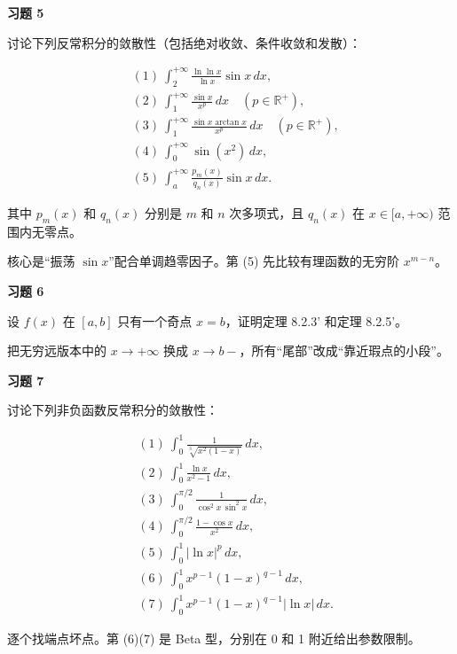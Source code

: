 \begin{exercisebox}
\textbf{习题 5 }

讨论下列反常积分的敛散性（包括绝对收敛、条件收敛和发散）：

\[
      \begin{aligned}
      &(1)\ \int_2^{+\infty}\frac{\ln\ln x}{\ln x}\sin x\,dx,\\
      &(2)\ \int_1^{+\infty}\frac{\sin x}{x^p}\,dx\quad(p\in\mathbb R^+),\\
      &(3)\ \int_1^{+\infty}\frac{\sin x\arctan x}{x^p}\,dx\quad(p\in\mathbb R^+),\\
      &(4)\ \int_0^{+\infty}\sin(x^2)\,dx,\\
      &(5)\ \int_a^{+\infty}\frac{p_m(x)}{q_n(x)}\sin x\,dx.
      \end{aligned}
      \]

其中 \(p_m(x)\) 和 \(q_n(x)\) 分别是 \(m\) 和 \(n\) 次多项式，且 \(q_n(x)\) 在 \(x\in[a,+\infty)\) 范围内无零点。

\begin{hintbox}
核心是“振荡 \(\sin x\)”配合单调趋零因子。第 (5) 先比较有理函数的无穷阶 \(x^{m-n}\)。
\end{hintbox}
\end{exercisebox}

\begin{exercisebox}
\textbf{习题 6 }

设 \(f(x)\) 在 \([a,b]\) 只有一个奇点 \(x=b\)，证明定理 8.2.3' 和定理 8.2.5'。

\begin{hintbox}
把无穷远版本中的 \(x\to+\infty\) 换成 \(x\to b-\)，所有“尾部”改成“靠近瑕点的小段”。
\end{hintbox}
\end{exercisebox}

\begin{exercisebox}
\textbf{习题 7 }

讨论下列非负函数反常积分的敛散性：

\[
      \begin{aligned}
      &(1)\ \int_0^1\frac{1}{\sqrt[3]{x^2(1-x)}}\,dx,\\
      &(2)\ \int_0^1\frac{\ln x}{x^2-1}\,dx,\\
      &(3)\ \int_0^{\pi/2}\frac{1}{\cos^2x\,\sin^2x}\,dx,\\
      &(4)\ \int_0^{\pi/2}\frac{1-\cos x}{x^2}\,dx,\\
      &(5)\ \int_0^1|\ln x|^p\,dx,\\
      &(6)\ \int_0^1x^{p-1}(1-x)^{q-1}\,dx,\\
      &(7)\ \int_0^1x^{p-1}(1-x)^{q-1}|\ln x|\,dx.
      \end{aligned}
      \]

\begin{hintbox}
逐个找端点坏点。第 (6)(7) 是 Beta 型，分别在 0 和 1 附近给出参数限制。
\end{hintbox}
\end{exercisebox}

